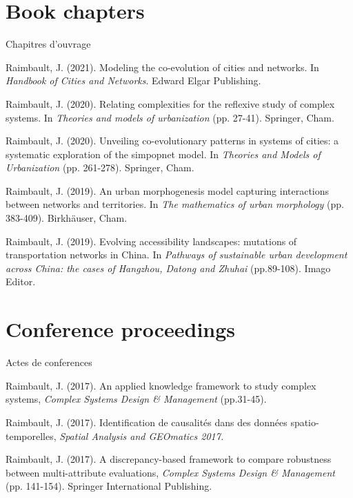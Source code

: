 \section*{Book chapters}{Chapitres d'ouvrage}


\noindent Raimbault, J. (2021). Modeling the co-evolution of cities and networks. In \textit{Handbook of Cities and Networks}. Edward Elgar Publishing.

\bigskip

\noindent Raimbault, J. (2020). Relating complexities for the reflexive study of complex systems. In \textit{Theories and models of urbanization} (pp. 27-41). Springer, Cham.

\bigskip

\noindent Raimbault, J. (2020). Unveiling co-evolutionary patterns in systems of cities: a systematic exploration of the simpopnet model. In \textit{Theories and Models of Urbanization} (pp. 261-278). Springer, Cham.

\bigskip

\noindent Raimbault, J. (2019). An urban morphogenesis model capturing interactions between networks and territories. In \textit{The mathematics of urban morphology} (pp. 383-409). Birkhäuser, Cham.

\bigskip

\noindent Raimbault, J. (2019). Evolving accessibility landscapes: mutations of transportation networks in China. In \textit{Pathways of sustainable urban development across China: the cases of Hangzhou, Datong and Zhuhai} (pp.89-108). Imago Editor.


\section*{Conference proceedings}{Actes de conferences}


\noindent Raimbault, J. (2017). An applied knowledge framework to study complex systems, \textit{Complex Systems Design \& Management} (pp.31-45).

\bigskip

\noindent Raimbault, J. (2017). Identification de causalités dans des données spatio-temporelles, \textit{Spatial Analysis and GEOmatics 2017.}

\bigskip

\noindent Raimbault, J. (2017). A discrepancy-based framework to compare robustness between multi-attribute evaluations, \textit{Complex Systems Design \& Management} (pp. 141-154). Springer International Publishing. 

